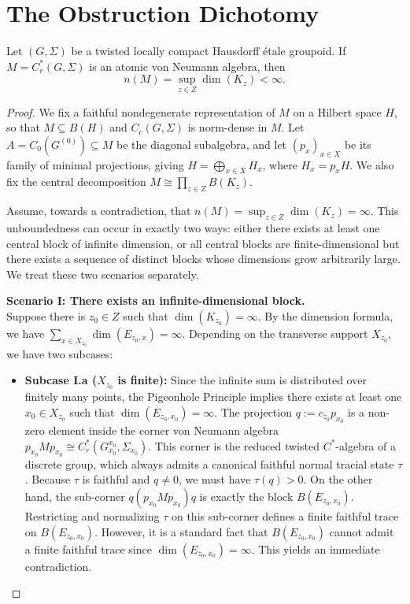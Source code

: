 \section{The Obstruction Dichotomy}

\begin{theorem}\label{thm:obstruction}
Let $(G,\Sigma)$ be a twisted locally compact Hausdorff étale groupoid. 
If $M = C_r^*(G,\Sigma)$ is an atomic von Neumann algebra, then 
\[
n(M) = \sup_{z \in Z} \dim(K_z) < \infty.
\]
\end{theorem}

\begin{proof}
We fix a faithful nondegenerate representation of $M$ on a Hilbert space $H$, so that $M \subseteq B(H)$ and $C_c(G,\Sigma)$ is norm-dense in $M$. Let $A = C_0(G^{(0)}) \subseteq M$ be the diagonal subalgebra, and let $(p_x)_{x \in X}$ be its family of minimal projections, giving $H = \bigoplus_{x \in X} H_x$, where $H_x = p_x H$. We also fix the central decomposition $M \cong \prod_{z \in Z} B(K_z)$.

Assume, towards a contradiction, that $n(M) = \sup_{z \in Z} \dim(K_z) = \infty$. 
This unboundedness can occur in exactly two ways: either there exists at least one central block of infinite dimension, or all central blocks are finite-dimensional but there exists a sequence of distinct blocks whose dimensions grow arbitrarily large. We treat these two scenarios separately.

\medskip
\noindent
\textbf{Scenario I: There exists an infinite-dimensional block.} \\
Suppose there is $z_0 \in Z$ such that $\dim(K_{z_0}) = \infty$. By the dimension formula, we have $\sum_{x \in X_{z_0}} \dim(E_{z_0,x}) = \infty$. 
Depending on the transverse support $X_{z_0}$, we have two subcases:

\begin{itemize}
    \item \textbf{Subcase I.a ($X_{z_0}$ is finite):} Since the infinite sum is distributed over finitely many points, the Pigeonhole Principle implies there exists at least one $x_0 \in X_{z_0}$ such that $\dim(E_{z_0, x_0}) = \infty$. 
    The projection $q := c_{z_0} p_{x_0}$ is a non-zero element inside the corner von Neumann algebra $p_{x_0} M p_{x_0} \cong C_r^*(G_{x_0}^{x_0}, \Sigma_{x_0})$. This corner is the reduced twisted $C^*$-algebra of a discrete group, which always admits a canonical faithful normal tracial state $\tau$. 
    Because $\tau$ is faithful and $q \neq 0$, we must have $\tau(q) > 0$. 
    On the other hand, the sub-corner $q (p_{x_0} M p_{x_0}) q$ is exactly the block $B(E_{z_0, x_0})$. Restricting and normalizing $\tau$ on this sub-corner defines a finite faithful trace on $B(E_{z_0, x_0})$. However, it is a standard fact that $B(E_{z_0, x_0})$ cannot admit a finite faithful trace since $\dim(E_{z_0, x_0}) = \infty$. This yields an immediate contradiction.
    

\end{itemize}
\end{proof}
